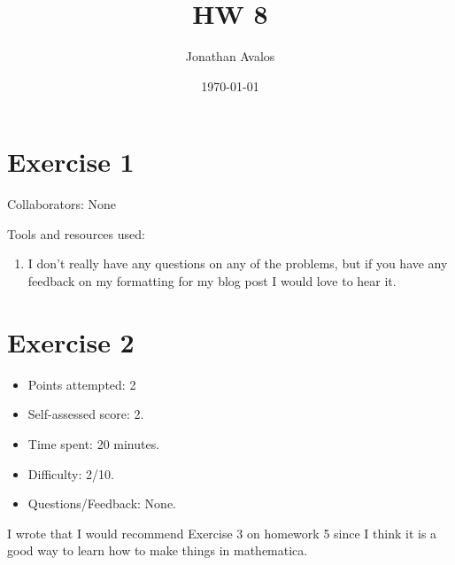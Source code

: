 \documentclass[12pt]{article}
\title{HW 8}
\author{Jonathan Avalos}
\date{\today}
\begin{document}
\maketitle

\section*{Exercise 1}
Collaborators: None

\noindent
Tools and resources used:

\begin{enumerate}
  \item[3] I don't really have any questions on any of the problems, but if you have any feedback on my formatting 
  for my blog post I would love to hear it. 
\end{enumerate}
\pagebreak

\section*{Exercise 2}
\begin{itemize}
  \item Points attempted: 2
  \item Self-assessed score: 2.
  \item Time spent: 20 minutes.
  \item Difficulty: 2/10.
  \item Questions/Feedback: None.
\end{itemize}

I wrote that I would recommend Exercise 3 on homework 5 since I think it is a good way to learn how to make things in mathematica.

\pagebreak
\end{document}
